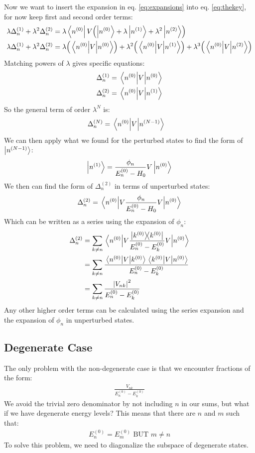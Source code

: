 \documentclass[12pt]{article}
\begin{document}
Now we want to insert the expansion in eq. \eqref{eq:expansions} into eq. \eqref{eq:thekey}, for now keep first and second order terms:
\begin{align*}
  \lambda\Delta_n^{(1)}+\lambda^2\Delta_n^{(2)}
  &=\lambda\bra{n^{(0)}}V
  \qty(\ket{n^{(0)}}+\lambda\ket{n^{(1)}}+\lambda^2\ket{n^{(2)}})\\
  \lambda\Delta_n^{(1)}+\lambda^2\Delta_n^{(2)}&=
  \lambda\qty(\mel{n^{(0)}}{V}{n^{(0)}})
  +\lambda^2\qty(\mel{n^{(0)}}{V}{n^{(1)}})
  +\lambda^3\qty(\mel{n^{(0)}}{V}{n^{(2)}})
\end{align*}
Matching powers of $\lambda$ gives specific equations:
\begin{align*}
  \Delta_n^{(1)}&=\mel{n^{(0)}}{V}{n^{(0)}}\\
  \Delta_n^{(2)}&=\mel{n^{(0)}}{V}{n^{(1)}}
\end{align*}
So the general term of order $\lambda^N$ is:
\begin{align*}
  \Delta_n^{(N)}&=\mel{n^{(0)}}{V}{n^{(N-1)}}
\end{align*}
We can then apply what we found for the perturbed states to find the form of $\ket{n^{(N-1)}}$:
\begin{align*}
  \ket{n^{(1)}}=\frac{\phi_n}{E_n^{(0)}-H_0}V\ket{n^{(0)}}
\end{align*}
We then can find the form of $\Delta_n^{(2)}$ in terms of unperturbed states:
\begin{align*}
  \Delta_n^{(2)}=\mel{n^{(0)}}{V\frac{\phi_n}{E_n^{(0)}-H_0}V}{n^{(0)}}
\end{align*}
Which can be written as a series using the expansion of $\phi_n$:
\begin{align*}
  \Delta_n^{(2)}&=\sum_{k\neq n}
  \mel{n^{(0)}}{V\frac{\dyad{k^{(0)}}}{E_n^{(0)}-E_k^{(0)}}V}{n^{(0)}}\\
  &=\sum_{k\neq n}\frac{\mel{n^{(0)}}{V}{k^{(0)}}\mel{k^{(0)}}{V}{n^{(0)}}}
  {E_n^{(0)}-E_k^{(0)}}\\
  &=\sum_{k\neq n}\frac{\abs{V_{nk}}^2}
  {E_n^{(0)}-E_k^{(0)}}
\end{align*}
Any other higher order terms can be calculated using the series expansion and the expansion of $\phi_n$ in unperturbed states.

\subsection{Degenerate Case}
The only problem with the non-degenerate case is that we encounter fractions of the form:
\begin{align*}
  \frac{V_{nk}}{E_n^{(0)}-E_k^{(0)}}
\end{align*}
We avoid the trivial zero denominator by not including $n$ in our sums, but what if we have degenerate energy levels? This means that there are $n$ and $m$ such that:
\begin{align*}
  E_n^{(0)}=E_m^{(0)}\text{ BUT }m\neq n
\end{align*}
To solve this problem, we need to diagonalize the subspace of degenerate states.
\end{document}
